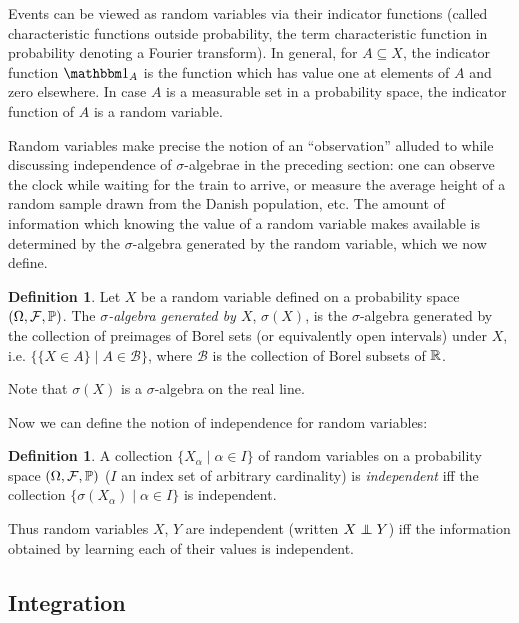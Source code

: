 \documentclass[leqno]{article}
\theoremstyle{definition}
\newtheorem{definition}[theorem]{Definition}
\newcommand{\bldset}[2]{\{{#1}\mid{#2}\}}
\newcommand\indep{\protect\mathpalette{\protect\independenT}{\perp}}
\def\independenT#1#2{\mathrel{\rlap{$#1#2$}\mkern2mu{#1#2}}}
\begin{document}
Events can be viewed as random variables via their indicator functions (called characteristic functions outside probability, the term characteristic function in probability denoting a Fourier transform). In general, for $A \subseteq X$, the indicator function $\mathbbm 1_A$ is the function which has value one at elements of $A$ and zero elsewhere. In case $A$ is a measurable set in a probability space, the indicator function of $A$ is a random variable.

Random variables make precise the notion of an ``observation'' alluded to while discussing independence of $\sigma$-algebrae in the preceding section: one can observe the clock while waiting for the train to arrive, or measure the average height of a random sample drawn from the Danish population, etc. The amount of information which knowing the value of a random variable makes available is determined by the $\sigma$-algebra generated by the random variable, which we now define.

\begin{definition}
Let $X$ be a random variable defined on a probability space $(\Omega, \mathcal F, \P)$. The {\em $\sigma$-algebra generated by $X$}, $\sigma(X)$, is the $\sigma$-algebra generated by the collection of preimages of Borel sets (or equivalently open intervals) under $X$, i.e. $\bldset{\{X \in A\}}{A \in \mathcal B}$, where $\mathcal B$ is the collection of Borel subsets of $\R$.
\end{definition}

Note that $\sigma(X)$ is a $\sigma$-algebra on the real line.

Now we can define the notion of independence for random variables:

\begin{definition}
A collection $\bldset{X_\alpha}{\alpha \in I}$ of random variables on a probability space $(\Omega, \mathcal F, \P)$ ($I$ an index set of arbitrary cardinality) is {\em independent} iff the collection $\bldset{\sigma(X_\alpha)}{\alpha \in I}$ is independent.
\end{definition}

Thus random variables $X$, $Y$ are independent (written $X \indep Y$) iff the information obtained by learning each of their values is independent.


\subsection{Integration}
\end{document}
